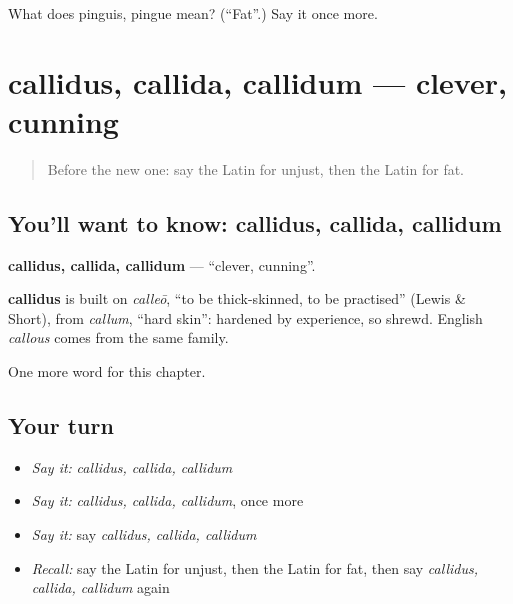 \begin{tcolorbox}[breakable,colback=teal!4,colframe=teal!35!black,title={Before you move on}]
What does pinguis, pingue mean? (\textquotedblleft{}Fat\textquotedblright{}.) Say it once more.
\end{tcolorbox}
\section[callidus, callida, callidum]{callidus, callida, callidum — clever, cunning}

\label{lesson:LA-C267-callidus}



\begin{quote}
Before the new one: say the Latin for unjust, then the Latin for fat.
\end{quote}

\subsection*{You'll want to know: callidus, callida, callidum}
\textbf{callidus, callida, callidum} — \textquotedblleft{}clever, cunning\textquotedblright{}.

\begin{cousinweb}
\textbf{callidus} is built on \emph{calleō}, \textquotedblleft{}to be thick-skinned, to be practised\textquotedblright{} (Lewis \& Short), from \emph{callum}, \textquotedblleft{}hard skin\textquotedblright{}: hardened by experience, so shrewd. English \emph{callous} comes from the same family.
\end{cousinweb}

\begin{grammarlens}[title={What you've built}]
One more word for this chapter.
\end{grammarlens}

\subsection*{Your turn}
\begin{itemize}
\raggedright
  \item \emph{Say it:} \emph{callidus, callida, callidum}
  \item \emph{Say it:} \emph{callidus, callida, callidum}, once more
  \item \emph{Say it:} say \emph{callidus, callida, callidum}
  \item \emph{Recall:} say the Latin for unjust, then the Latin for fat, then say \emph{callidus, callida, callidum} again
\end{itemize}

